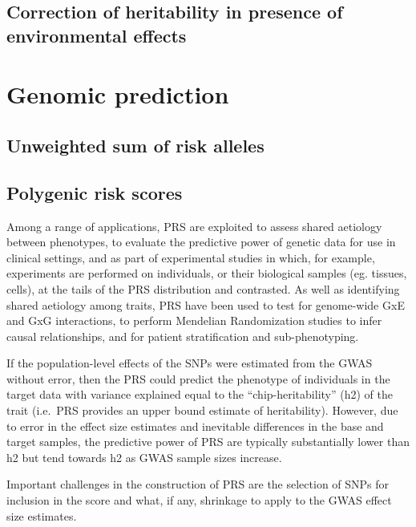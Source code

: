 \documentclass[
]{book}
\begin{document}
\hypertarget{correction-of-heritability-in-presence-of-environmental-effects}{%
\section{Correction of heritability in presence of environmental effects}\label{correction-of-heritability-in-presence-of-environmental-effects}}

\hypertarget{genomic-prediction}{%
\chapter{Genomic prediction}\label{genomic-prediction}}

\hypertarget{unweighted-sum-of-risk-alleles}{%
\section{Unweighted sum of risk alleles}\label{unweighted-sum-of-risk-alleles}}

\hypertarget{polygenic-risk-scores}{%
\section{Polygenic risk scores}\label{polygenic-risk-scores}}

Among a range of applications, PRS are exploited to assess shared aetiology between phenotypes, to evaluate the predictive power of genetic data for use in clinical settings, and as part of experimental studies in which, for example, experiments are performed on individuals, or their biological samples (eg. tissues, cells), at the tails of the PRS distribution and contrasted.
As well as identifying shared aetiology among traits, PRS have been used to test for genome-wide GxE and GxG interactions, to perform Mendelian Randomization studies to infer causal relationships, and for patient stratification and sub-phenotyping.

If the population-level effects of the SNPs were estimated from the GWAS without error, then the PRS could predict the phenotype of individuals in the target data with variance explained equal to the ``chip-heritability'' (h2) of the trait (i.e.~PRS provides an upper bound estimate of heritability). However, due to error in the effect size estimates and inevitable differences in the base and target samples, the predictive power of PRS are typically substantially lower than h2 but tend towards h2 as GWAS sample sizes increase.

Important challenges in the construction of PRS are the selection of SNPs for inclusion in the score and what, if any, shrinkage to apply to the GWAS effect size estimates.
\end{document}
